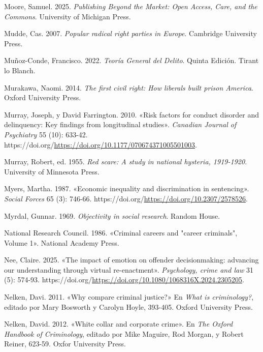 \documentclass[
  spanish,
  letterpaper,
  DIV=11,
  numbers=noendperiod]{scrreprt}
\newlength{\cslhangindent}
\newenvironment{CSLReferences}[2] %
 {\begin{list}{}{%
  \setlength{\itemindent}{0pt}
  \setlength{\leftmargin}{0pt}
  \setlength{\parsep}{0pt}
  \ifodd #1
   \setlength{\leftmargin}{\cslhangindent}
   \setlength{\itemindent}{-1\cslhangindent}
  \fi
  \setlength{\itemsep}{#2\baselineskip}}}
 {\end{list}}
\begin{document}
\begin{CSLReferences}{1}{0}
Moore, Samuel. 2025. \emph{Publishing Beyond the Market: Open Access,
Care, and the Commons}. University of Michigan Press.

Mudde, Cas. 2007. \emph{Popular radical right parties in Europe}.
Cambridge University Press.

Muñoz-Conde, Francisco. 2022. \emph{Teoría General del Delito}. Quinta
Edición. Tirant lo Blanch.

Murakawa, Naomi. 2014. \emph{The first civil right: How liberals built
prison America}. Oxford University Press.

Murray, Joseph, y David Farrington. 2010. {«Risk factors for conduct
disorder and delinquency: Key findings from longitudinal studies»}.
\emph{Canadian Journal of Psychiatry} 55 (10): 633-42.
https://doi.org/\url{https://doi.org/10.1177/070674371005501003}.

Murray, Robert, ed. 1955. \emph{Red scare: A study in national hysteria,
1919-1920}. University of Minnesota Press.

Myers, Martha. 1987. {«Economic inequality and discrimination in
sentencing»}. \emph{Social Forces} 65 (3): 746-66.
https://doi.org/\url{https://doi.org/10.2307/2578526}.

Myrdal, Gunnar. 1969. \emph{Objectivity in social research}. Random
House.

National Research Council. 1986. {«Criminal careers and "career
criminals", Volume 1»}. National Academy Press.

Nee, Claire. 2025. {«The impact of emotion on offender decisionmaking:
advancing our understanding through virtual re-enactment»}.
\emph{Psychology, crime and law} 31 (5): 574-93.
https://doi.org/\url{https://doi.org/10.1080/1068316X.2024.2305205}.

Nelken, Davi. 2011. {«Why compare criminal justice?»} En \emph{What is
criminology?}, editado por Mary Bosworth y Carolyn Hoyle, 393-405.
Oxford University Press.

Nelken, David. 2012. {«White collar and corporate crime»}. En \emph{The
Oxford Handbook of Criminology}, editado por Mike Maguire, Rod Morgan, y
Robert Reiner, 623-59. Oxfor University Press.


\end{CSLReferences}
\end{document}

